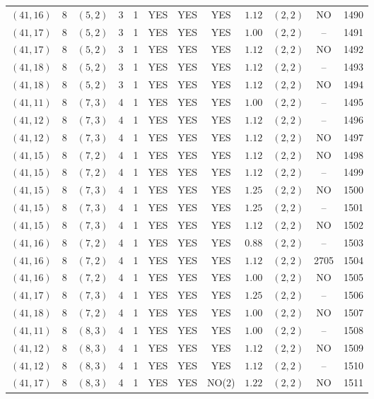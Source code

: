 \begin{longtable}{|c|c|c|c|c|c|c|c|c|c|c|c|}
$(41,16)$ & 8 & $(5,2)$ & 3 & 1 & YES & YES & YES & $1.12$ & $(2,2)$ & NO & 1490\\
$(41,17)$ & 8 & $(5,2)$ & 3 & 1 & YES & YES & YES & $1.00$ & $(2,2)$ & -- & 1491\\
$(41,17)$ & 8 & $(5,2)$ & 3 & 1 & YES & YES & YES & $1.12$ & $(2,2)$ & NO & 1492\\
$(41,18)$ & 8 & $(5,2)$ & 3 & 1 & YES & YES & YES & $1.12$ & $(2,2)$ & -- & 1493\\
$(41,18)$ & 8 & $(5,2)$ & 3 & 1 & YES & YES & YES & $1.12$ & $(2,2)$ & NO & 1494\\
$(41,11)$ & 8 & $(7,3)$ & 4 & 1 & YES & YES & YES & $1.00$ & $(2,2)$ & -- & 1495\\
$(41,12)$ & 8 & $(7,3)$ & 4 & 1 & YES & YES & YES & $1.12$ & $(2,2)$ & -- & 1496\\
$(41,12)$ & 8 & $(7,3)$ & 4 & 1 & YES & YES & YES & $1.12$ & $(2,2)$ & NO & 1497\\
$(41,15)$ & 8 & $(7,2)$ & 4 & 1 & YES & YES & YES & $1.12$ & $(2,2)$ & NO & 1498\\
$(41,15)$ & 8 & $(7,2)$ & 4 & 1 & YES & YES & YES & $1.12$ & $(2,2)$ & -- & 1499\\
$(41,15)$ & 8 & $(7,3)$ & 4 & 1 & YES & YES & YES & $1.25$ & $(2,2)$ & NO & 1500\\
$(41,15)$ & 8 & $(7,3)$ & 4 & 1 & YES & YES & YES & $1.25$ & $(2,2)$ & -- & 1501\\
$(41,15)$ & 8 & $(7,3)$ & 4 & 1 & YES & YES & YES & $1.12$ & $(2,2)$ & NO & 1502\\
$(41,16)$ & 8 & $(7,2)$ & 4 & 1 & YES & YES & YES & $0.88$ & $(2,2)$ & -- & 1503\\
$(41,16)$ & 8 & $(7,2)$ & 4 & 1 & YES & YES & YES & $1.12$ & $(2,2)$ & 2705 & 1504\\
$(41,16)$ & 8 & $(7,2)$ & 4 & 1 & YES & YES & YES & $1.00$ & $(2,2)$ & NO & 1505\\
$(41,17)$ & 8 & $(7,3)$ & 4 & 1 & YES & YES & YES & $1.25$ & $(2,2)$ & -- & 1506\\
$(41,18)$ & 8 & $(7,2)$ & 4 & 1 & YES & YES & YES & $1.00$ & $(2,2)$ & NO & 1507\\
$(41,11)$ & 8 & $(8,3)$ & 4 & 1 & YES & YES & YES & $1.00$ & $(2,2)$ & -- & 1508\\
$(41,12)$ & 8 & $(8,3)$ & 4 & 1 & YES & YES & YES & $1.12$ & $(2,2)$ & NO & 1509\\
$(41,12)$ & 8 & $(8,3)$ & 4 & 1 & YES & YES & YES & $1.12$ & $(2,2)$ & -- & 1510\\
$(41,17)$ & 8 & $(8,3)$ & 4 & 1 & YES & YES & NO(2) & $1.22$ & $(2,2)$ & NO & 1511\\

\end{longtable}

